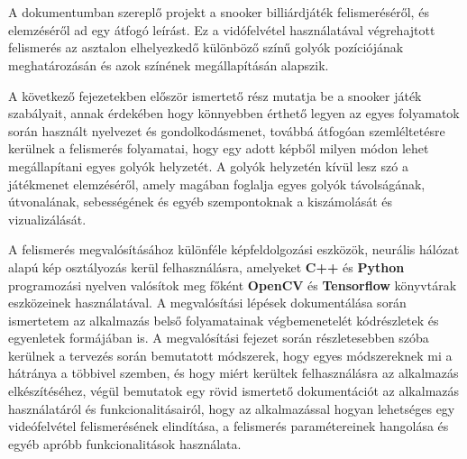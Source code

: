 \chapter*{\bevezetes}

A dokumentumban szereplő projekt a snooker billiárdjáték felismeréséről, és elemzéséről ad egy átfogó leírást. Ez a vidófelvétel használatával végrehajtott felismerés az asztalon elhelyezkedő különböző színű golyók pozíciójának meghatározásán és azok színének megállapításán alapszik.
\par A következő fejezetekben először ismertető rész mutatja be a snooker játék szabályait, annak érdekében hogy könnyebben érthető legyen az egyes folyamatok során használt nyelvezet és gondolkodásmenet, továbbá átfogóan szemléltetésre kerülnek a felismerés folyamatai, hogy egy adott képből milyen módon lehet megállapítani egyes golyók helyzetét. A golyók helyzetén kívül lesz szó a játékmenet elemzéséről, amely magában foglalja egyes golyók távolságának, útvonalának, sebességének és egyéb szempontoknak a kiszámolását és vizualizálását.
\par A felismerés megvalósításához különféle képfeldolgozási eszközök, neurális hálózat alapú kép osztályozás kerül felhasználásra, amelyeket \textbf{C++} és \textbf{Python} programozási nyelven valósítok meg főként \textbf{OpenCV} és \textbf{Tensorflow} könyvtárak eszközeinek használatával. A megvalósítási lépések dokumentálása során ismertetem az alkalmazás belső folyamatainak végbemenetelét kódrészletek és egyenletek formájában is. A megvalósítási fejezet során részletesebben szóba kerülnek a tervezés során bemutatott módszerek, hogy egyes módszereknek mi a hátránya a többivel szemben, és hogy miért kerültek felhasználásra az alkalmazás elkészítéséhez, végül bemutatok egy rövid ismertető dokumentációt az alkalmazás használatáról és funkcionalitásairól, hogy az alkalmazással hogyan lehetséges egy videófelvétel felismerésének elindítása, a felismerés paramétereinek hangolása és egyéb apróbb funkcionalitások használata.